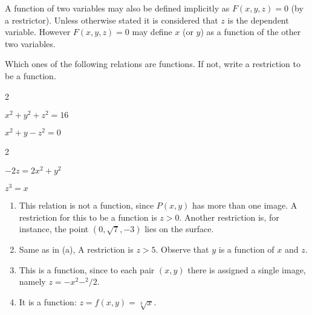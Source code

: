 \documentclass[11pt]{amsbook}
\begin{document}
	
	\par A function of two variables may also be defined implicitly as $F(x, y, z)=0$ (by a restrictor). Unless otherwise stated it is considered that $z$ is the dependent variable. However $F(x, y, z)=0$ may define $x$ (or $y$) as a function of the other two variables.
	\begin{exmp}
		Which ones of the following relations are functions. If not, write a restriction to be a function.
			\begin{enumerate}[label=\alph*)]
			\end{enumerate}
			
			\begin{hSolution}
	
				\begin{enumerate}[label=\alph*)]
					
					\item This relation is not a function, since $P(x, y)$ has more than one image. A restriction for this to be a function is $z>0$. Another restriction is, for instance, the point $(0, \sqrt{7}, -3)$ lies on the surface.
					\item Same as in (a), A restriction is $z>5$. Observe that $y$ is a function of $x$ and $z$.
					\item This is a function, since to each pair $(x, y)$ there is assigned a single image, namely $z=-x^2-^2/2$.
					\item It is a function: $z= f(x, y) = \sqrt[3]{x}$.
				\end{enumerate}
			\end{hSolution}

	\end{exmp}
\end{document}
